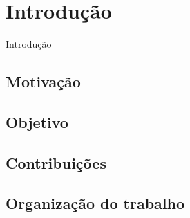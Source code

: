 \chapter[Introdução]{Introdução}
Introdução

\section{Motivação}
\lipsum[100]

\section{Objetivo}
\lipsum[100]

\section{Contribuições}

\section{Organização do trabalho}